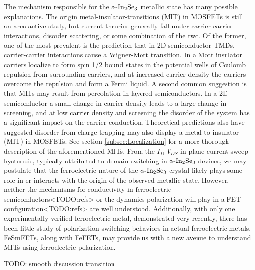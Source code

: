 The mechanism responsible for the $\textrm{\ensuremath{\alpha}-In}_{2}\textrm{Se}_{3}$
metallic state has many possible explanations. The origin metal-insulator-transitions
(MIT) in MOSFETs is still an area active study\citep{moon2021metalinsulator},
but current theories generally fall under carrier-carrier interactions,
disorder scattering, or some combination of the two. Of the former,
one of the most prevalent is the prediction that in 2D semiconductor
TMDs, carrier-carrier interactions cause a Wigner-Mott transition\citep{amaricci2010extended,moon2021metalinsulator,moon2020quantum}.
In a Mott insulator carriers localize to form spin 1/2 bound states
in the potential wells of Coulomb repulsion from surrounding carriers,
and at increased carrier density the carriers overcome the repulsion
and form a Fermi liquid. A second common suggestion is that MITs may
result from percolation in layered semiconductors\citep{moon2019anomalous,tracy2009observation,moon2021metalinsulator,manfra2007transport,dassarma2005twodimensional}.
In a 2D semiconductor a small change in carrier density leads to a
large change in screening, and at low carrier density and screening
the disorder of the system has a significant impact on the carrier
conduction. Theoretical predictions also have suggested disorder from
charge trapping may also display a metal-to-insulator (MIT) in MOSFETs\citep{brunthaler2007trap,altshuler1999theory,hormann2010dipole}.
See section \ref{subsec:Localization} for a more thorough description
of the aforementioned MITs. From the $I_{D}$-$V_{DS}$ in plane current
sweep hysteresis, typically attributed to domain switching in $\textrm{\ensuremath{\alpha}-In}_{2}\textrm{Se}_{3}$
devices, we may postulate that the ferroelectric nature of the $\textrm{\ensuremath{\alpha}-In}_{2}\textrm{Se}_{3}$
crystal likely plays some role in or interacts with the origin of
the observed metallic state. However, neither the mechanisms for conductivity
in ferroelectric semiconductors<TODO:refs> or the dynamics polarization
will play in a FET configuration<TODO:refs> are well understood. Additionally,
with only one experimentally verified ferroelectric metal\citep{zhou2020review},
demonstrated very recently\citep{fei2018ferroelectric,sharma2019roomtemperature},
there has been little study of polarization switching behaviors in
actual ferroelectric metals. FeSmFETs, along with FeFETs\citep{lu2018electrically},
may provide us with a new avenue to understand MITs using ferroelectric
polarization. 

TODO: smooth discussion transition


